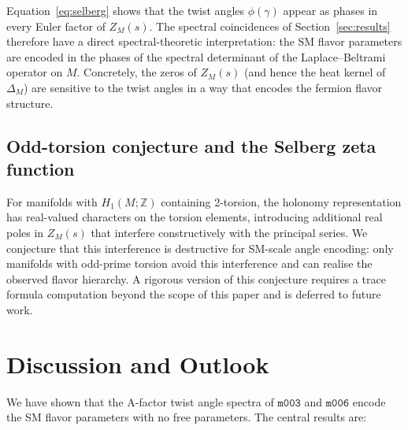 ﻿\documentclass[aps,prd,twocolumn,longbibliography]{revtex4-2}
\newcommand{\mfld}[1]{\texttt{#1}}
\begin{document}
Equation~\eqref{eq:selberg} shows that the twist angles $\phi(\gamma)$ appear
as phases in every Euler factor of $Z_M(s)$.
The spectral coincidences of Section~\ref{sec:results} therefore have a direct
spectral-theoretic interpretation: the SM flavor parameters are encoded in the
phases of the spectral determinant of the Laplace--Beltrami operator on $M$.
Concretely, the zeros of $Z_M(s)$ (and hence the heat kernel of $\Delta_M$)
are sensitive to the twist angles in a way that encodes the fermion flavor
structure.

\subsection{Odd-torsion conjecture and the Selberg zeta function}

For manifolds with $H_1(M;\mathbb{Z})$ containing 2-torsion, the holonomy
representation has real-valued characters on the torsion elements, introducing
additional real poles in $Z_M(s)$ that interfere constructively with the
principal series.
We conjecture that this interference is destructive for SM-scale angle
encoding: only manifolds with odd-prime torsion avoid this interference and
can realise the observed flavor hierarchy.
A rigorous version of this conjecture requires a trace formula computation
beyond the scope of this paper and is deferred to future work.

\section{Discussion and Outlook}
\label{sec:discussion}

We have shown that the A-factor twist angle spectra of $\mfld{m003}$ and
$\mfld{m006}$ encode the SM flavor parameters with no free parameters.
The central results are:
\end{document}
